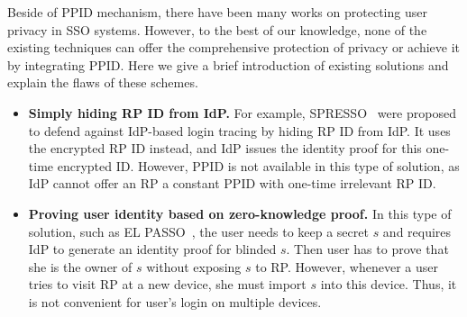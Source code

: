 Beside of PPID mechanism, there have been many works on protecting user privacy in SSO systems. 
However, to the best of our knowledge, none of the existing techniques can offer the comprehensive protection of privacy or achieve it by integrating PPID. 
Here we give a brief introduction of existing solutions
and explain the flaws of these schemes. 
\begin{itemize}
\item {\noindent\textbf{Simply hiding RP ID from IdP. }}For example, SPRESSO~\cite{SPRESSO} were proposed to defend against IdP-based login tracing by hiding RP ID from IdP. It uses the encrypted RP ID instead, and IdP issues the identity proof for this one-time encrypted ID. 
However, PPID is not available in this type of solution, as IdP cannot offer an RP a constant PPID with one-time irrelevant RP ID.
\item {\noindent\textbf{Proving user identity based on zero-knowledge proof. }}In this type of solution, such as EL PASSO~\cite{ZhangKSZR21}, the user needs to keep a secret $s$ and requires IdP to generate an identity proof for blinded $s$. Then user has to prove that she is the owner of $s$ without exposing $s$ to RP. 
However, whenever a user tries to visit RP at a new device, she must import  $s$ into this device. Thus, it is not convenient for user's login on multiple devices. 
\end{itemize}



